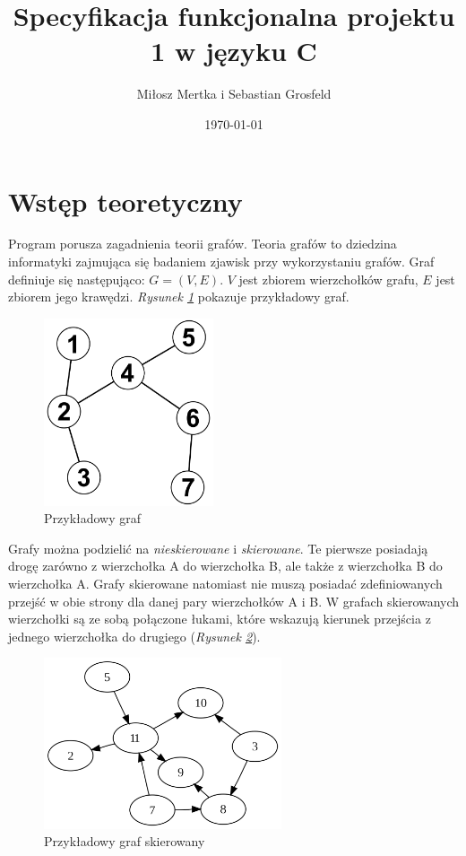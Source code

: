 \documentclass{article}
\title{Specyfikacja funkcjonalna projektu 1 w języku C}
\author{Miłosz Mertka i Sebastian Grosfeld}
\date{\today}
\begin{document}
\maketitle

\tableofcontents

\newpage

\setlength{\headheight}{23pt}

\section{Wstęp teoretyczny}

Program porusza zagadnienia teorii grafów. Teoria grafów to dziedzina informatyki zajmująca się badaniem zjawisk przy wykorzystaniu grafów. Graf definiuje się następująco: $G=(V,E)$. $V$ jest zbiorem wierzchołków grafu, $E$ jest zbiorem jego krawędzi. \emph{Rysunek \ref{fig:graph}} pokazuje przykładowy graf.

\begin{figure}[htp]
    \centering
    \includegraphics[width=5cm]{images/graph.png}
    \caption{Przykładowy graf}
    \label{fig:graph}
\end{figure}

Grafy można podzielić na \emph{nieskierowane} i \emph{skierowane}. Te pierwsze posiadają drogę zarówno z wierzchołka A do wierzchołka B, ale także z wierzchołka B do wierzchołka A. Grafy skierowane natomiast nie muszą posiadać zdefiniowanych przejść w obie strony dla danej pary wierzchołków A i B. W grafach skierowanych wierzchołki są ze sobą połączone łukami, które wskazują kierunek przejścia z jednego wierzchołka do drugiego (\emph{Rysunek \ref{fig:directed_graph}}).

\begin{figure}[htp]
    \centering
    \includegraphics[width=7cm]{images/directed_graph.png}
    \caption{Przykładowy graf skierowany}
    \label{fig:directed_graph}
\end{figure}
\end{document}

